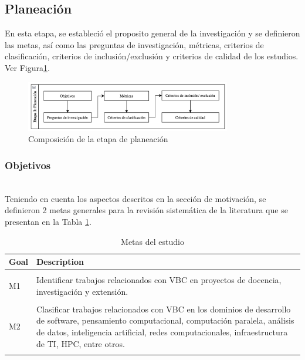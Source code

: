 \subsection{Planeación}
En esta etapa, se estableció el proposito general de la investigación y se definieron las metas, así como las preguntas de investigación, métricas, criterios de clasificación, criterios de inclusión/exclusión y criterios de calidad de los estudios.
Ver Figura\ref{fig:etapa1}.

\begin{figure}[htbp]
    \centering
    \includegraphics[width=0.8\textwidth]{resources/images/planeacion/etapa1.png}
    \caption{Composición de la etapa de planeación}\label{fig:etapa1}
\end{figure}


\subsubsection{Objetivos}
\mbox{}\\
Teniendo en cuenta los aspectos descritos en la sección de motivación, se definieron 2 metas generales para la revisión sistemática de la literatura que se presentan en la Tabla \ref{tab:metas}.

\begin{table}[H]
    \centering
    \begin{tabular}{>{\centering\arraybackslash}m{1cm}>{\arraybackslash}m{7cm}}
        \hline
        \textbf{Goal} & \textbf{Description} \\
        \hline
        \\
        M1 & Identificar trabajos relacionados con VBC en proyectos de docencia, investigación y extensión. \\
        \\
        M2 & Clasificar trabajos relacionados con VBC en los dominios de desarrollo de software, pensamiento computacional, computación paralela, análisis de datos, inteligencia artificial, redes computacionales, infraestructura de TI, HPC, entre otros. \\
        \\
        \hline
    \end{tabular}
    \caption{Metas del estudio}\label{tab:metas}
\end{table}


